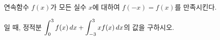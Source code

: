 연속함수 $f(x)$가 모든 실수 $x$에 대하여 $f(-x)=f(x)$를 만족시킨다. \par\smallskip{}\par\smallskip\noindent 일 때, 정적분 $\displaystyle\int_{0}^{3}f(x)\mkern3mu dx+\int_{-3}^{3}xf(x)\mkern3mu dx$의 값을 구하시오.
